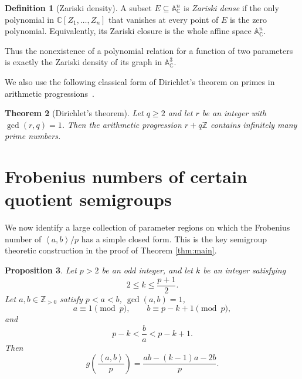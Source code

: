 \documentclass[reqno, 12pt]{article}
\numberwithin{equation}{section}
\newtheorem{theorem}{Theorem}[section]
\newtheorem{proposition}[theorem]{Proposition}
\theoremstyle{definition}
\newtheorem{definition}[theorem]{Definition}
\newcommand{\Aff}{\mathbb A}
\newcommand{\ZZ}{\mathbb{Z}}
\newcommand{\CC}{\mathbb{C}}
\newcommand{\gen}[1]{\left\langle #1\right\rangle}
\begin{document}
\begin{definition}[Zariski density]\label{def:zariski}
A subset $E\subseteq\Aff^n_{\CC}$ is \emph{Zariski dense} if the only polynomial in $\CC[Z_1,\ldots,Z_n]$ that vanishes at every point of $E$ is the zero polynomial.  Equivalently, its Zariski closure is the whole affine
space $\Aff^n_{\CC}$.
\end{definition}

Thus the nonexistence of a polynomial relation for a function of two parameters is exactly the Zariski density of its graph in $\Aff^3_{\CC}$.


We also use the following classical form of Dirichlet's theorem on primes in arithmetic progressions~\cite{Davenport}.
\begin{theorem}[Dirichlet's theorem]\label{thm:Dirichlet}
Let $q\ge2$ and let $r$ be an integer with $\gcd(r,q)=1$. Then the arithmetic progression $r+q\ZZ$ contains
infinitely many prime numbers.
\end{theorem}


\section{Frobenius numbers of certain quotient semigroups}\label{Section-Three-FN}

We now identify a large collection of parameter regions on which the Frobenius number of $\gen{a,b}/p$ has a simple closed form.  This is the key semigroup theoretic construction in the proof of Theorem \ref{thm:main}.

\begin{proposition}\label{prop:explicit-branch}
Let $p>2$ be an odd integer, and let $k$ be an integer satisfying
\begin{equation}\label{eq:k-range}
  2\le k\le\frac{p+1}{2}.
\end{equation}
Let $a,b\in\ZZ_{>0}$ satisfy $p<a<b$, $\gcd(a,b)=1$,
\begin{equation}\label{eq:branch-congruences}
a\equiv1\pmod p, \qquad b\equiv p-k+1\pmod p,
\end{equation}
and
\begin{equation}\label{eq:branch-slope}
  p-k<\frac{b}{a}<p-k+1.
\end{equation}
Then
\begin{equation}\label{eq:explicit-branch}
  g\!\left(\frac{\gen{a,b}}{p}\right)
  =\frac{ab-(k-1)a-2b}{p}.
\end{equation}
\end{proposition}
\end{document}
